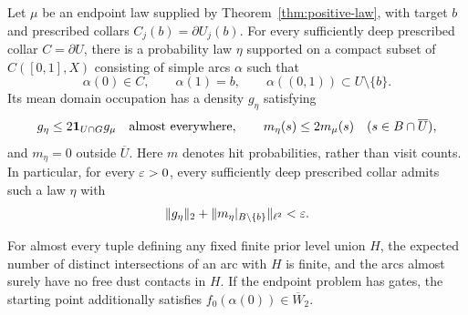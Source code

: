 \begin{lemma}\label{lem:compact-arcs}
Let $\mu$ be an endpoint law supplied by
Theorem~\ref{thm:positive-law}, with target $b$ and prescribed collars
$C_j(b)=\partial U_j(b)$.  For every sufficiently deep prescribed collar
$C=\partial U$, there is a probability law $\eta$ supported on a compact
subset of $C([0,1],X)$ consisting of simple arcs $\alpha$ such that
\[
 \alpha(0)\in C,\qquad \alpha(1)=b,\qquad
 \alpha((0,1))\subset U\setminus\{b\}.
\]
Its mean domain occupation has a density $g_\eta$ satisfying
\begin{equation}\label{eq:arc-occupation}
 g_\eta\le 2\mathbf 1_{U\cap G}g_\mu
 \quad\text{almost everywhere},
 \qquad
 m_\eta(s)\le 2m_\mu(s)\quad(s\in B\cap\overline U),
\end{equation}
and $m_\eta=0$ outside $\overline U$.  Here $m$ denotes hit
probabilities, rather than visit counts.  In particular, for every
$\varepsilon>0$, every sufficiently deep prescribed collar admits such a law
$\eta$ with
\begin{equation}\label{eq:arc-smallness}
 \|g_\eta\|_2+
 \|m_\eta|_{B\setminus\{b\}}\|_{\ell^2}
 <\varepsilon.
\end{equation}

For almost every tuple defining any fixed finite prior level union $H$,
the expected number of distinct intersections of an arc with $H$ is
finite, and the arcs almost surely have no free dust contacts in $H$.
If the endpoint problem has gates, the starting point additionally
satisfies $f_0(\alpha(0))\in\overline W_2$.
\end{lemma}

